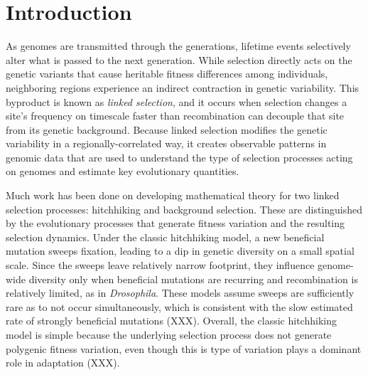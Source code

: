 \documentclass[11pt]{article}
\title{}
\author{Vince Buffalo and Andrew Kern}
\begin{document}
\maketitle

\section*{Introduction}

As genomes are transmitted through the generations, lifetime events selectively
alter what is passed to the next generation. While selection directly acts on
the genetic variants that cause heritable fitness differences among
individuals, neighboring regions experience an indirect contraction in genetic
variability. This byproduct is known as \emph{linked selection}, and it occurs
when selection changes a site's frequency on timescale faster than
recombination can decouple that site from its genetic background. Because
linked selection modifies the genetic variability in a regionally-correlated
way, it creates observable patterns in genomic data that are used to understand
the type of selection processes acting on genomes and estimate key evolutionary
quantities. 


Much work has been done on developing mathematical theory for two linked
selection processes: hitchhiking and background selection. These are
distinguished by the evolutionary processes that generate fitness variation and
the resulting selection dynamics. Under the classic hitchhiking model, a new
beneficial mutation sweeps fixation, leading to a dip in genetic diversity on a
small spatial scale. Since the sweeps leave relatively narrow footprint, they
influence genome-wide diversity only when beneficial mutations are recurring
and recombination is relatively limited, as in \emph{Drosophila}. These models
assume sweeps are sufficiently rare as to not occur simultaneously, which is
consistent with the slow estimated rate of strongly beneficial mutations (XXX).
Overall, the classic hitchhiking model is simple because the underlying
selection process does not generate polygenic fitness variation, even though
this is type of variation plays a dominant role in adaptation (XXX).
\end{document}
